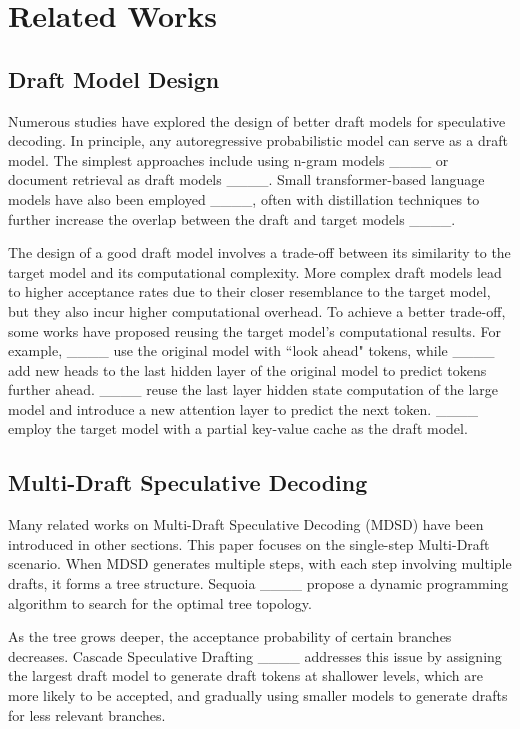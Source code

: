 \section{Related Works}
\label{se:related_work}
\subsection{Draft Model Design}
Numerous studies have explored the design of better draft models for speculative decoding. In principle, any autoregressive probabilistic model can serve as a draft model. The simplest approaches include using n-gram models ____ or document retrieval as draft models ____. Small transformer-based language models have also been employed ____, often with distillation techniques to further increase the overlap between the draft and target models ____.


The design of a good draft model involves a trade-off between its similarity to the target model and its computational complexity. More complex draft models lead to higher acceptance rates due to their closer resemblance to the target model, but they also incur higher computational overhead. To achieve a better trade-off, some works have proposed reusing the target model's computational results. For example, ____ use the original model with ``look ahead" tokens, while ____ add new heads to the last hidden layer of the original model to predict tokens further ahead. ____ reuse the last layer hidden state computation of the large model and introduce a new attention layer to predict the next token. ____ employ the target model with a partial key-value cache as the draft model.


\subsection{Multi-Draft Speculative Decoding}\label{sec:related_mdsd}
Many related works on Multi-Draft Speculative Decoding (MDSD) have been introduced in other sections. This paper focuses on the single-step Multi-Draft scenario. When MDSD generates multiple steps, with each step involving multiple drafts, it forms a tree structure. Sequoia ____ propose a dynamic programming algorithm to search for the optimal tree topology.

As the tree grows deeper, the acceptance probability of certain branches decreases. Cascade Speculative Drafting ____ addresses this issue by assigning the largest draft model to generate draft tokens at shallower levels, which are more likely to be accepted, and gradually using smaller models to generate drafts for less relevant branches.

